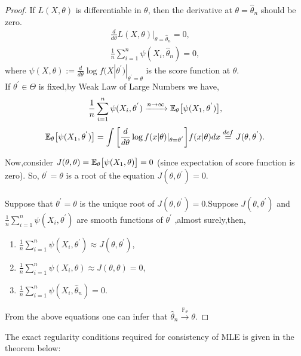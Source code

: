 \documentclass[a4paper,english,12pt]{article}
\begin{document}
\begin{proof} 
If $L(X,\theta)$ is differentiable in $\theta$, then the derivative at $\theta = \hat{\theta}_n$ should be zero.
\begin{eqnarray}
{\frac{d}{d\theta}L(X,\theta)|_{\theta=\hat{\theta}_n}} = 0,\\
\frac{1}{n}\sum_{i=1}^{n}\psi(X_i,\hat{\theta}_n)= 0,
\end{eqnarray}
where $ \psi(X,\theta) := \frac{d}{d\theta}\log f(X|\theta^{'})|_{\theta^{'}=\theta}$ is the score function at $\theta$.\\
If $\theta^{'} \in \Theta$ is fixed,by Weak Law of Large Numbers we have,
\begin{equation}
\frac{1}{n}\sum_{i=1}^{n}\psi(X_i,\theta^{'}) \xrightarrow{n\rightarrow \infty} \mathbb{E}_\theta\big[\psi(X_1,\theta^{'})\big],
\end{equation}
\begin{equation}
\mathbb{E}_\theta\big[\psi(X_1,\theta^{'})\big]=\int \bigg[ \frac{d}{d\theta}\log f(x|\theta)|_{\theta=\theta^{'}}\bigg]f(x|\theta)dx \overset{def}{=}J(\theta,\theta^{'}).
\end{equation}
\par Now,consider $J(\theta,\theta)= \mathbb{E}_\theta\big[\psi(X_1,\theta)\big] =0 $ (since expectation of score function is zero). So, $\theta^{'}=\theta$ is a root of the equation  $J(\theta,\theta^{'})=0$.\\\\
Suppose that $\theta^{'}=\theta$ is the unique root of $J(\theta,\theta^{'})=0$.Suppose $J(\theta,\theta^{'})$ and $\frac{1}{n}\sum_{i=1}^{n}\psi(X_i,\theta^{'})$ are smooth functions of $\theta^{'}$
,almost surely,then, \begin{enumerate}
\item $\frac{1}{n}\sum_{i=1}^{n}\psi(X_i,\theta^{'}) \approx J(\theta, \theta^{'})$,
\item $\frac{1}{n}\sum_{i=1}^{n}\psi(X_i,\theta) \approx J(\theta, \theta)=0$,
\item $\frac{1}{n}\sum_{i=1}^{n}\psi(X_i,\hat{\theta}_n) =0$.
\end{enumerate}
From the above equations one can infer that  $\hat{\theta}_n \xrightarrow{\mathbb{P}_\theta} \theta$.
\end{proof}
The exact regularity conditions required for consistency of MLE is given in the theorem below: 
\end{document}
